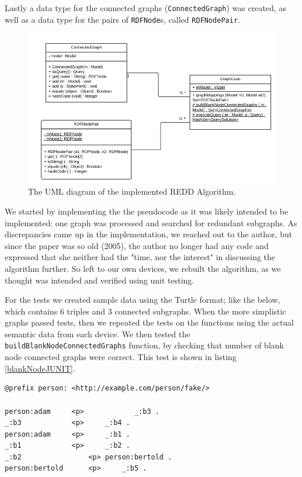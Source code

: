 Lastly a data type for the connected graphs (\texttt{ConnectedGraph}) was created, as well as a data type for the pairs of \texttt{RDFNode}s, called \texttt{RDFNodePair}.

\begin{figure}[h]
\centering
\includegraphics[width=\textwidth]{Figures/REDDuml.png}
\caption{The UML diagram of the implemented REDD Algorithm.}
\end{figure}

We started by implementing the the pseudocode as it was likely intended to be implemented: one graph was processed and searched for redundant subgraphs. As discrepancies came up in the implementation, we reached out to the author, but since the paper was so old (2005), the author no longer had any code and expressed that she neither had the "time, nor the interest" in discussing the algorithm further. So left to our own devices, we rebuilt the algorithm, as we thought was intended and verified using unit testing.

For the tests we created sample data using the Turtle format; like the below, which contains 6 triples and 3 connected subgraphs. When the more simplistic graphs passed tests, then we repeated the tests on the functions using the actual semantic data from each device. We then tested the \texttt{buildBlankNodeConnectedGraphs} function, by checking that number of blank node connected graphs were correct. This test is shown in listing \ref{blankNodeJUNIT}.

\begin{lstlisting}[caption={Some sample data that we created for unit testing, written in Turtle.}, frame=single]
@prefix person: <http://example.com/person/fake/>

person:adam		<p>            _:b3 .
_:b3			<p>		_:b4 .
person:adam		<p>		_:b1 .
_:b1			<p>		_:b2 .
_:b2		        <p>	person:bertold .
person:bertold  	<p>		_:b5 .
\end{lstlisting}
\vspace{.5cm}

